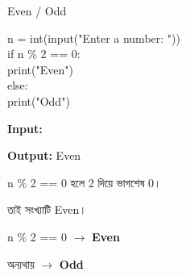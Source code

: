 

\begin{codeoutputbox}{Even / Odd}

\noindent
\begin{minipage}[t]{0.54\linewidth}
\codeheading

\begin{english}
\ttfamily
n = int(input("Enter a number: "))\\[0.5mm]
if n \% 2 == 0:\\
\hspace*{4mm}print("Even")\\
else:\\
\hspace*{4mm}print("Odd")
\end{english}

\end{minipage}
\hfill
\begin{minipage}[t]{0.42\linewidth}
\outputheading

\textbf{Input:}
\textenglish{}

\medskip

\textbf{Output:}
\textenglish{\ttfamily Even}

\medskip

\textenglish{\ttfamily n \% 2 == 0}
হলে 2 দিয়ে ভাগশেষ 0।

তাই সংখ্যাটি Even।

\end{minipage}

\end{codeoutputbox}

\begin{rememberbox}

\begin{center}

\textenglish{\ttfamily n \% 2 == 0}
\(\longrightarrow\)
\textbf{Even}

\qquad

অন্যথায়
\(\longrightarrow\)
\textbf{Odd}

\end{center}

\end{rememberbox}


